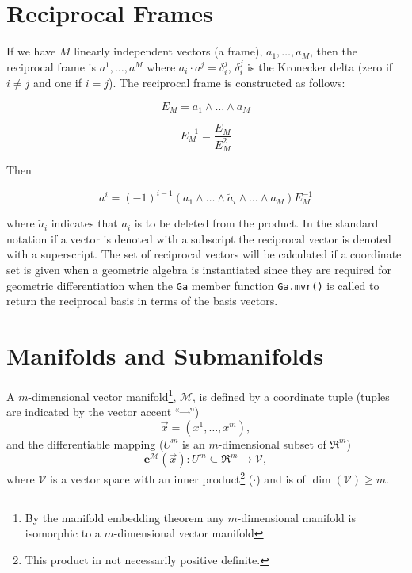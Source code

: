 \documentclass[12pt]{report}
\newcommand{\bm}[1]{\boldsymbol{#1}}
\newcommand{\bfrac}[2]{\displaystyle\frac{#1}{#2}}
\newcommand{\lp}{\left (}
\newcommand{\rp}{\right )}
\newcommand{\W}{\wedge}
\newcommand{\f}[2]{{#1}\lp {#2} \rp}
\newcommand{\paren}[1]{\lp {#1} \rp}
\newcommand{\be}{\begin{equation}}
\newcommand{\ee}{\end{equation}}
\newcommand{\T}[1]{\texttt{#1}}
\begin{document}
\section{Reciprocal Frames}

If we have $M$ linearly independent vectors (a frame),
$a_{1},\dots,a_{M}$, then the reciprocal frame is
$a^{1},\dots,a^{M}$ where $a_{i}\cdot a^{j} = \delta_{i}^{j}$,
$\delta_{i}^{j}$ is the Kronecker delta (zero if $i \ne j$ and one
if $i = j$). The reciprocal frame is constructed as follows:

  \begin{equation}
    E_{M} = a_{1}\W\dots\W a_{M}
  \end{equation}

  \begin{equation}
    E_{M}^{-1} = \bfrac{E_{M}}{E_{M}^{2}}
  \end{equation}

Then

  \begin{equation}
    a^{i} = \lp -1\rp^{i-1}\lp a_{1}\W\dots\W \breve{a}_{i} \W\dots\W a_{M}\rp E_{M}^{-1}
  \end{equation}

where $\breve{a}_{i}$ indicates that $a_{i}$ is to be deleted from
the product.  In the standard notation if a vector is denoted with a subscript
the reciprocal vector is denoted with a superscript. The set of reciprocal vectors
will be calculated if a coordinate set is given when a geometric algebra is instantiated since
they are required for geometric differentiation when the \T{Ga} member function \T{Ga.mvr()}
is called to return the reciprocal basis in terms of the basis vectors.

\section{Manifolds and Submanifolds}\label{sect_manifold}

A $m$-dimensional vector manifold\footnote{By the manifold embedding theorem any $m$-dimensional
manifold is isomorphic to a $m$-dimensional vector manifold}, $\mathcal{M}$, is defined by a
coordinate tuple (tuples are indicated by the vector accent ``$\vec{\;\;\;}$'')
\be
    \vec{x} = \paren{x^{1},\dots,x^{m}},
\ee
and the differentiable mapping ($U^{m}$ is an $m$-dimensional subset of $\Re^{m}$)
\be
    \f{\bm{e}^{\mathcal{M}}}{\vec{x}}\colon U^{m}\subseteq\Re^{m}\rightarrow \mathcal{V},
\ee
where $\mathcal{V}$ is a vector space with an inner product\footnote{This product in not necessarily positive definite.} ($\cdot$) and is of $\f{\dim}{\mathcal{V}} \ge m$.
\end{document}
